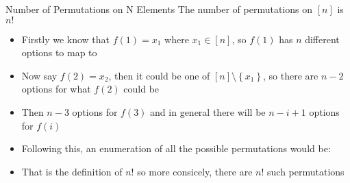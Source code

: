 \begin{proposition}{Number of Permutations on N Elements}
  The number of permutations on $ \left[ n \right]$ is $n!$ 
  \begin{pf}
    \begin{itemize}
      \item Firstly we know that $f\left(1\right) = x_1$ where $x_1 \in  \left[ n \right]$, so $f\left(1\right)$ has $n$ different options to map to
      \item Now say $ f\left(2\right) = x_{2}$, then it could be one of $ \left[ n \right] \setminus \left\{ x_{1} \right\}$, so there are $n-2$ options for what $f\left(2\right)$ could be
      \item Then $n-3$ options for $f\left(3\right)$ and in general there will be $n  - i + 1$ options for $f\left(i\right)$
      \item Following this, an enumeration of all the possible permutations would be:
      \item That is the definition of $n!$ so more consicely, there are $n!$ such permutations
    \end{itemize}
  \end{pf}
\end{proposition}
